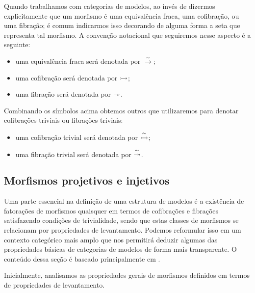\begin{obs}
  Quando trabalhamos com categorias de modelos, ao invés de dizermos explicitamente que um morfismo é uma equivalência fraca, uma cofibração, ou uma fibração; é comum indicarmos isso decorando de alguma forma a seta que representa tal morfismo.
  A convenção notacional que seguiremos nesse aspecto é a seguinte:
  \begin{itemize}
  \item uma equivalência fraca será denotada por $\overset{\sim}{\rightarrow}$;
    
  \item uma cofibração será denotada por $\rightarrowtail$;
    
  \item uma fibração será denotada por $\twoheadrightarrow$.
  \end{itemize}
  Combinando os símbolos acima obtemos outros que utilizaremos para denotar cofibrações triviais ou fibrações triviais:
  \begin{itemize}
  \item uma cofibração trivial será denotada por $\overset{\sim}{\rightarrowtail}$;
    
  \item uma fibração trivial será denotada por $\overset{\sim}{\twoheadrightarrow}$.
  \end{itemize}
\end{obs}

\subsection{Morfismos projetivos e injetivos}

Uma parte essencial na definição de uma estrutura de modelos é a existência de fatorações de morfismos quaisquer em termos de cofibrações e fibrações satisfazendo condições de trivialidade, sendo que estas classes de morfismos se relacionam por propriedades de levantamento.
Podemos reformular isso em um contexto categórico mais amplo que nos permitirá deduzir algumas das propriedades básicas de categorias de modelos de forma mais transparente.
O conteúdo dessa seção é baseado principalmente em \cite{nlab:injective_or_projective_morphism}.

Inicialmente, analisamos as propriedades gerais de morfismos definidos em termos de propriedades de levantamento.

